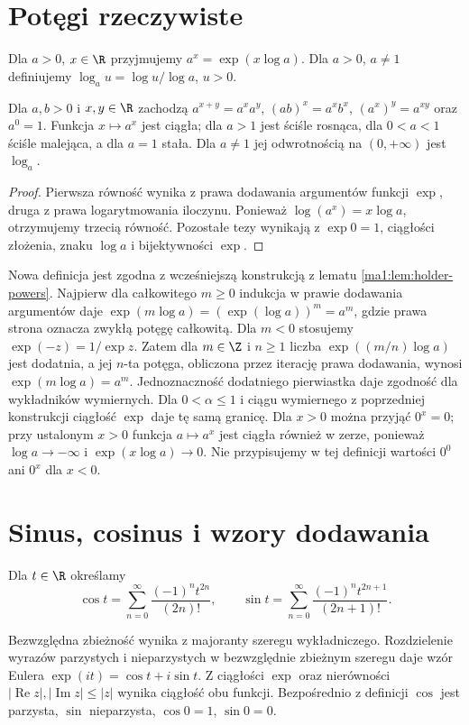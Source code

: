 \section{Potęgi rzeczywiste}
\begin{definicja}
\label{ma1:def:real-powers}
Dla $a>0$, $x\in\R$ przyjmujemy $a^x=\exp(x\log a)$. Dla $a>0$, $a\ne1$ definiujemy $\log_a u=\log u/\log a$, $u>0$.
\end{definicja}
\begin{twierdzenie}
\label{ma1:thm:power-laws}
Dla $a,b>0$ i $x,y\in\R$ zachodzą $a^{x+y}=a^xa^y$, $(ab)^x=a^xb^x$, $(a^x)^y=a^{xy}$ oraz $a^0=1$. Funkcja $x\mapsto a^x$ jest ciągła; dla $a>1$ jest ściśle rosnąca, dla $0<a<1$ ściśle malejąca, a dla $a=1$ stała. Dla $a\ne1$ jej odwrotnością na $(0,+\infty)$ jest $\log_a$.
\end{twierdzenie}
\begin{proof}
Pierwsza równość wynika z prawa dodawania argumentów funkcji $\exp$, druga z prawa logarytmowania iloczynu. Ponieważ $\log(a^x)=x\log a$, otrzymujemy trzecią równość. Pozostałe tezy wynikają z $\exp0=1$, ciągłości złożenia, znaku $\log a$ i bijektywności $\exp$.
\end{proof}
Nowa definicja jest zgodna z wcześniejszą konstrukcją z lematu \ref{ma1:lem:holder-powers}. Najpierw dla całkowitego $m\ge0$ indukcja w prawie dodawania argumentów daje $\exp(m\log a)=(\exp(\log a))^m=a^m$, gdzie prawa strona oznacza zwykłą potęgę całkowitą. Dla $m<0$ stosujemy $\exp(-z)=1/\exp z$. Zatem dla $m\in\Z$ i $n\ge1$ liczba $\exp((m/n)\log a)$ jest dodatnia, a jej $n$-ta potęga, obliczona przez iterację prawa dodawania, wynosi $\exp(m\log a)=a^m$. Jednoznaczność dodatniego pierwiastka daje zgodność dla wykładników wymiernych. Dla $0<\alpha\le1$ i ciągu wymiernego z poprzedniej konstrukcji ciągłość $\exp$ daje tę samą granicę. Dla $x>0$ można przyjąć $0^x=0$; przy ustalonym $x>0$ funkcja $a\mapsto a^x$ jest ciągła również w zerze, ponieważ $\log a\to-\infty$ i $\exp(x\log a)\to0$. Nie przypisujemy w tej definicji wartości $0^0$ ani $0^x$ dla $x<0$.

\section{Sinus, cosinus i wzory dodawania}
\begin{definicja}
\label{ma1:def:trig-series}
Dla $t\in\R$ określamy
\[
 \cos t=\sum_{n=0}^\infty\frac{(-1)^nt^{2n}}{(2n)!},
 \qquad
 \sin t=\sum_{n=0}^\infty\frac{(-1)^nt^{2n+1}}{(2n+1)!}.
\]
\end{definicja}
Bezwzględna zbieżność wynika z majoranty szeregu wykładniczego. Rozdzielenie wyrazów parzystych i nieparzystych w bezwzględnie zbieżnym szeregu daje wzór Eulera $\exp(it)=\cos t+i\sin t$. Z ciągłości $\exp$ oraz nierówności $|\operatorname{Re}z|,|\operatorname{Im}z|\le|z|$ wynika ciągłość obu funkcji. Bezpośrednio z definicji $\cos$ jest parzysta, $\sin$ nieparzysta, $\cos0=1$, $\sin0=0$.

